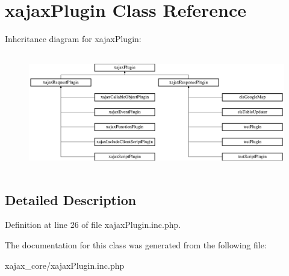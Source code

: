 \hypertarget{classxajaxPlugin}{
\section{xajaxPlugin Class Reference}
\label{classxajaxPlugin}
}
Inheritance diagram for xajaxPlugin:\begin{figure}[H]
\begin{center}
\leavevmode
\includegraphics[height=5.157895cm]{classxajaxPlugin}
\end{center}
\end{figure}


\subsection{Detailed Description}


Definition at line 26 of file xajaxPlugin.inc.php.



The documentation for this class was generated from the following file:\begin{DoxyCompactItemize}
\item 
xajax\_\-core/xajaxPlugin.inc.php\end{DoxyCompactItemize}
